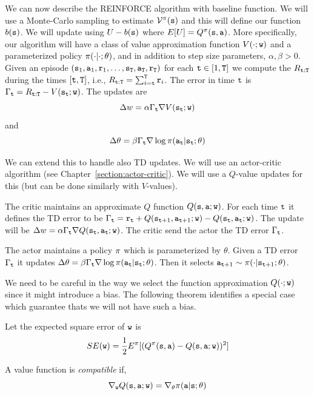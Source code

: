 We can now describe the REINFORCE algorithm with baseline function.
We will use a Monte-Carlo sampling to estimate
$\mathcal{V}^\pi({\tt s})$ and this will define our function
$b({\tt s})$. We will update using $U-b({\tt s})$ where
$E[U]=Q^\pi({\tt s},{\tt a})$. More specifically, our algorithm
will have a class of value approximation function $V(\cdot;{\tt w})$
and a parameterized policy $\pi(\cdot|\cdot;\theta)$, and in
addition to step size parameters, $\alpha,\beta>0$. Given an episode
$({\tt s}_1,{\tt a}_1,{\tt r}_1,
\ldots,{\tt s}_{\tt T},{\tt a}_{\tt T},{\tt r}_{\tt T})$ for each ${\tt t}\in [1,{\tt T}]$ we
compute the $R_{{\tt t}:{\tt T}}$ during the times $[{\tt t},{\tt T}]$, i.e.,
$R_{{\tt t}:{\tt T}}=\sum_{i={\tt t}}^{\tt T} {\tt r}_i$. The error in time ${\tt t}$ is
$\Gamma_{\tt t}=R_{{\tt t}:{\tt T}}-V({\tt s}_{\tt t};{\tt w})$. The updates
are
\[
\Delta w=\alpha \Gamma_{\tt t} \nabla V({\tt s}_{\tt t};{\tt w})
\]
and
\[
\Delta \theta=\beta\Gamma_{\tt t} \nabla \log
\pi({\tt a}_{\tt t}|{\tt s}_{\tt t};\theta)
\]

We can extend this to handle also TD updates. We will use an
actor-critic algorithm (see Chapter~\ref{section:actor-critic}). We will use a $Q$-value updates for this
(but can be done similarly with $V$-values).

The critic maintains an approximate $Q$ function $Q({\tt s},{\tt a};{\tt w})$. For each time ${\tt t}$ it defines the TD error to be $\Gamma_{\tt t} = {\tt r}_{\tt t} +Q({\tt s}_{{\tt t}+1},{\tt a}_{{\tt t}+1};{\tt w})-Q({\tt s}_{\tt t},{\tt a}_{\tt t};{\tt w})$. The update will be $\Delta w=\alpha\Gamma_{\tt t} \nabla Q({\tt s}_{\tt t},{\tt a}_{\tt t};{\tt w})$. The critic send the actor the TD error $\Gamma_{\tt t}$.

The actor maintains a policy $\pi$ which is parameterized by $\theta$. Given a TD error $\Gamma_{\tt t}$ it updates $\Delta \theta= \beta \Gamma_{\tt t} \nabla \log \pi({\tt a}_{\tt t}|{\tt s}_{\tt t};\theta)$. Then it selects ${\tt a}_{{\tt t}+1}\sim \pi(\cdot|{\tt s}_{{\tt t}+1};\theta)$.

We need to be careful in the way we select the function
approximation $Q(\cdot;{\tt w})$ since it might introduce a bias.
The following theorem identifies a special case which guarantee
thats we will not have such a bias.

Let the expected square error of ${\tt w}$ is
\[
SE({\tt w})=\frac{1}{2}E^\pi[(Q^\pi({\tt s},{\tt a})-Q({\tt s},{\tt a};{\tt w}))^2]
\]

A value function is {\em compatible} if,
\[
\nabla_{\tt w} Q({\tt s},{\tt a};{\tt w})= \nabla_\theta
\pi({\tt a}|{\tt s};\theta)
\]


